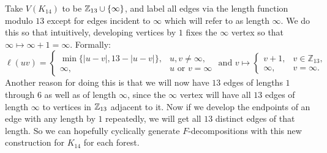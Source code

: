 Take $V(K_{14})$ to be $\mathbb{Z}_{13}\cup \{\infty\}$, and label all edges via the length function modulo $13$ except for edges incident to $\infty$ which will refer to as length $\infty$. We do this so that intuitively, developing vertices by $1$ fixes the $\infty$ vertex so that $\infty\mapsto \infty+1=\infty$. Formally:
$$\ell(uv)=\begin{cases}\min\{|u-v|,13-|u-v|\}, & u,v\neq \infty, \\ \infty, & u\text{ or }v=\infty \end{cases} \text{ and }v\mapsto 
\begin{cases}
  v+1,&v\in\mathbb{Z}_{13},\\
  \infty,        &v=\infty.
  \end{cases}$$
Another reason for doing this is that we will now have $13$ edges of lengths $1$ through $6$ as well as of length $\infty$, since the $\infty$ vertex will have all $13$ edges of length $\infty$ to vertices in $\mathbb{Z}_{13}$ adjacent to it. Now if we develop the endpoints of an edge with any length by $1$ repeatedly, we will get all $13$ distinct edges of that length. So we can hopefully cyclically generate $F$-decompositions with this new construction for $K_{14}$ for each forest.

